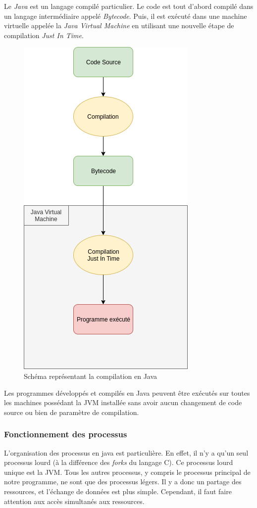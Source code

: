 Le \emph{Java} est un langage compilé particulier. Le code est tout d'abord compilé dans un langage intermédiaire appelé \emph{Bytecode}. 
Puis, il est exécuté dans une machine virtuelle appelée la \emph {Java Virtual Machine} en utilisant une nouvelle étape de compilation \emph {Just In Time}.
\par
\begin{figure}[ht]
    \label{Schéma compilation Java}
    \centering
    \includegraphics[scale=0.5]{images/java_compilation.png}
    \caption{Schéma représentant la compilation en Java}
\end{figure}
Les programmes développés et compilés en Java peuvent être exécutés sur toutes les machines possédant la JVM installée sans avoir aucun changement de code source ou bien de paramètre de compilation.
\subsubsection{Fonctionnement des processus}
L'organisation des processus en java est particulière. En effet, il n'y a qu'un seul processus lourd (à la différence des \emph{forks} du langage C).
Ce processus lourd unique est la JVM. Tous les autres processus, y compris le processus principal de notre programme, ne sont que des processus légers.
Il y a donc un partage des ressources, et l'échange de données est plus simple. Cependant, il faut faire attention aux accès simultanés aux ressources.

